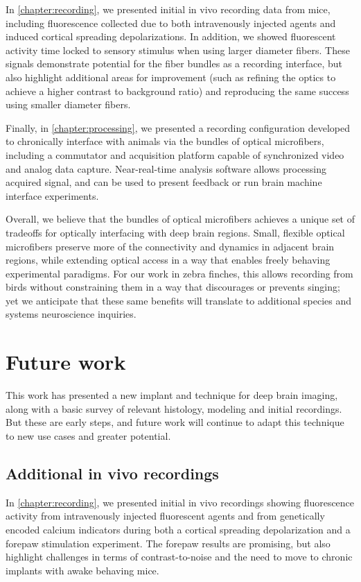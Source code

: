 In \cref{chapter:recording}, we presented initial 
in vivo recording data from mice, including fluorescence 
collected due to both intravenously injected agents 
and induced cortical spreading depolarizations. 
In addition, we showed fluorescent activity time 
locked to sensory stimulus when using larger diameter 
fibers. These signals demonstrate potential for the 
fiber bundles as a recording interface, but also 
highlight additional areas for improvement (such 
as refining the optics to achieve a higher 
contrast to background ratio) and 
reproducing the same success using smaller 
diameter fibers.

Finally, in \cref{chapter:processing}, we 
presented a recording configuration developed to chronically 
interface with animals via the bundles of optical 
microfibers, including a commutator and acquisition 
platform capable of synchronized video and analog 
data capture. Near-real-time analysis software 
allows processing acquired signal, and can be 
used to present feedback or run brain machine 
interface experiments.

Overall, we believe that the bundles of optical 
microfibers achieves a unique set of tradeoffs 
for optically interfacing with deep brain regions. 
Small, flexible optical microfibers preserve 
more of the connectivity and dynamics in adjacent 
brain regions, while extending optical access in a 
way that enables freely behaving experimental 
paradigms. For our work in zebra finches, this 
allows recording from birds without constraining 
them in a way that discourages or prevents singing; 
yet we anticipate that these same benefits will 
translate to additional species and systems 
neuroscience inquiries.

\section{Future work}

This work has presented a new implant and technique
for deep brain imaging, along with a basic survey of 
relevant histology, modeling and initial recordings. 
But these are early steps, and future work will 
continue to adapt this technique to new use cases
and greater potential.

\subsection{Additional in vivo recordings}

In \cref{chapter:recording}, we presented initial 
in vivo recordings showing fluorescence activity 
from intravenously injected fluorescent agents and 
from genetically encoded calcium indicators during 
both a cortical spreading depolarization and a 
forepaw stimulation experiment. The forepaw results 
are promising, but also highlight challenges in 
terms of contrast-to-noise and the need to move to 
chronic implants with awake behaving mice.

